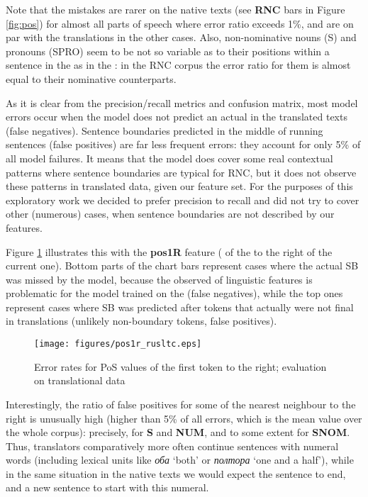 \documentclass[output=paper]{langsci/langscibook.cls}
\begin{document}
Note that the mistakes are rarer on the native texts (see \textbf{RNC} bars in Figure \ref{fig:pos}) for almost all parts of speech where error ratio exceeds 1\%, and are on par with the translations in the other cases. Also, non-nominative nouns (S) and pronouns (SPRO) seem to be not so variable as to their positions within a sentence in the  as in the : in the RNC corpus the error ratio for them is almost equal to their nominative counterparts.

As it is clear from the precision/recall metrics and confusion matrix, most model errors occur when the model does not predict an actual  in the translated texts (false negatives). Sentence boundaries predicted in the middle of running sentences (false positives) are far less frequent errors: they account for only 5\% of all model failures. It means that the model does cover some real contextual patterns where sentence boundaries are typical for RNC, but it does not observe these patterns in translated data, given our feature set. For the purposes of this exploratory work we decided to prefer precision to recall and did not try to cover other (numerous) cases, when sentence boundaries are not described by our features.  

Figure \ref{fig:pos1r} illustrates this with the \textbf{pos1R} feature ( of the  to the right of the current one). Bottom parts of the chart bars represent cases where the actual SB was missed by the model, because the observed  of linguistic features is problematic for the model trained on the   (false negatives), while the top ones represent cases where SB was predicted after tokens that actually were not final in translations (unlikely non-boundary tokens, false positives).

\begin{figure}
\caption{Error rates for PoS values of the first token to the right; evaluation on translational data}
\texttt{[image: figures/pos1r\_rusltc.eps]}
\label{fig:pos1r}
\end{figure}
Interestingly, the ratio of false positives for some  of the nearest neighbour to the right is unusually high (higher than 5\% of all errors, which is the mean value over the whole corpus): precisely, for \textbf{S} and \textbf{NUM}, and to some extent for \textbf{SNOM}. Thus, translators comparatively more often continue sentences with numeral words (including lexical units like \textit{оба} `both' or \textit{полтора} `one and a half'), while in the same situation in the native texts we would expect the sentence to end, and a new sentence to start with this numeral. 
\end{document}
